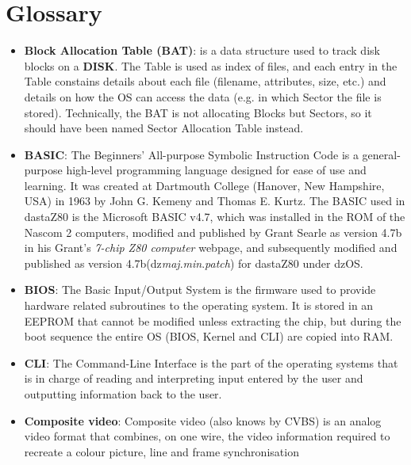 \section{Glossary}

\begin{itemize}
    \item \textbf{Block Allocation Table (BAT)}: is a data structure used to
        track disk blocks on a \textbf{DISK}. The Table is used as index of
        files, and each entry in the Table constains details about each file
        (filename, attributes, size, etc.) and details on how the OS can access
        the data (e.g. in which Sector the file is stored). Technically, the BAT
        is not allocating Blocks but Sectors, so it should have been named
        Sector Allocation Table instead.
    \item \textbf{BASIC}: The Beginners' All-purpose Symbolic Instruction Code
        is a general-purpose high-level programming language designed for ease
        of use and learning. It was created at Dartmouth College (Hanover, New
        Hampshire, USA) in 1963 by John G. Kemeny and Thomas E. Kurtz. The BASIC
        used in dastaZ80 is the Microsoft BASIC v4.7, which was installed in the
        ROM of the Nascom 2 computers, modified and published by Grant Searle
        as version 4.7b in his Grant's \textit{7-chip Z80 computer}
        webpage\cite{searle2}, and subsequently modified and published as
        version 4.7b(dz\textit{maj}.\textit{min}.\textit{patch}) for dastaZ80
        under dzOS.
    \item \textbf{BIOS}: The Basic Input/Output System is the firmware used to
        provide hardware related subroutines to the operating system. It is
        stored in an EEPROM that cannot be modified unless extracting the chip,
        but during the boot sequence the entire OS (BIOS, Kernel and CLI) are
        copied into RAM.
    \item \textbf{CLI}: The Command-Line Interface is the part of the operating
        systems that is in charge of reading and interpreting input entered by
        the user and outputting information back to the user.
    \item \textbf{Composite video}: Composite video (also knows by CVBS) is an
        analog video format that combines, on one wire, the video information
        required to recreate a colour picture, line and frame synchronisation

\end{itemize}
